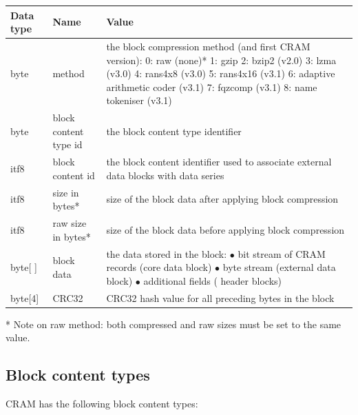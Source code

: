 \documentclass[a4paper]{article}
\begin{document}
\begin{tabular}{|l|>{\raggedright}p{120pt}|>{\raggedright}p{260pt}|}
\hline
\textbf{Data type} & \textbf{Name} & \textbf{Value}
\tabularnewline
\hline
byte & method & the block compression method (and first CRAM version): \linebreak{}
0: raw (none)*\linebreak{}
1: gzip\linebreak{}
2: bzip2 (v2.0)\linebreak{}
3: lzma (v3.0)\linebreak{}
4: rans4x8 (v3.0)\linebreak{}
5: rans4x16 (v3.1)\linebreak{}
6: adaptive arithmetic coder (v3.1)\linebreak{}
7: fqzcomp (v3.1)\linebreak{}
8: name tokeniser (v3.1)
\tabularnewline
\hline
byte & block content type id & the block content type identifier\tabularnewline
\hline
itf8 & block content id & the block content identifier used to associate external 
data blocks with data series\tabularnewline
\hline
itf8 & size in bytes* & size of the block data after applying block compression\tabularnewline
\hline
itf8 & raw size in bytes* & size of the block data before applying block compression\tabularnewline
\hline
byte[ ] & block data & the data stored in the block:\linebreak{}
$\bullet$ bit stream of CRAM records (core data block)\linebreak{}
$\bullet$ byte stream (external data block)\linebreak{}
$\bullet$ additional fields ( header blocks)\tabularnewline
\hline
byte[4] & CRC32 & CRC32 hash value for all preceding bytes in the block\tabularnewline
\hline
\end{tabular}

* Note on raw method: both compressed and raw sizes must be set to the same value.

\subsection{\textbf{Block content types}}

CRAM has the following block content types:
\end{document}

